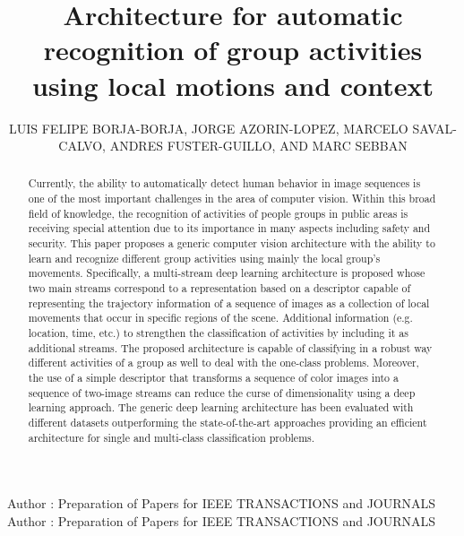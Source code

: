\documentclass{ieeeaccess}
\begin{document}

\title{Architecture for automatic recognition of group activities using local motions and context}
\author{\uppercase{Luis Felipe Borja-Borja}, 
\uppercase{Jorge Azorin-Lopez, Marcelo Saval-Calvo, Andres Fuster-Guillo, and Marc Sebban}}
\address[1]{Fac. Ingenier\'{i}a y Ciencias Aplicadas. Universidad Central del Ecuador, Quito, Ecuador  (e-mail: lborja@uce.edu.ec)}
\address[2]{Computer Technology Department, University of Alicante, Alicante, Spain (e-mail: jazorin@dtic.ua.es, msaval@dtic.ua.es, fuster@dtic.ua.es)}
\address[3]{Univ. Lyon, Univ. St-Etienne F-42000, UMR CNRS 5516, Laboratoire Hubert-Curien, France (e-mail: marc.sebban@univ-st-etienne.fr)}

\markboth
{Author \headeretal: Preparation of Papers for IEEE TRANSACTIONS and JOURNALS}
{Author \headeretal: Preparation of Papers for IEEE TRANSACTIONS and JOURNALS}


\begin{abstract}
Currently, the ability to automatically detect human behavior in image sequences is one of the most important challenges in the area of computer vision. Within this broad field of knowledge, the recognition of activities of people groups in public areas is receiving special attention due to its importance in many aspects including safety and security. This paper proposes a generic computer vision architecture with the ability to learn and recognize different group activities using mainly the local group's movements. Specifically, a multi-stream deep learning architecture is proposed whose two main streams correspond to a representation based on a descriptor capable of representing the trajectory information of a sequence of images as a collection of local movements that occur in specific regions of the scene. Additional information (e.g. location, time, etc.) to strengthen the classification of activities by including it as additional streams.  The proposed architecture is capable of classifying in a robust way different activities of a group as well to deal with the one-class problems. Moreover, the use of a simple descriptor that transforms a sequence of color images into a sequence of two-image streams can reduce the curse of dimensionality using a deep learning approach. The generic deep learning architecture has been evaluated with different datasets outperforming the state-of-the-art approaches providing an efficient architecture for single and multi-class classification problems.
\end{abstract}
\end{document}
